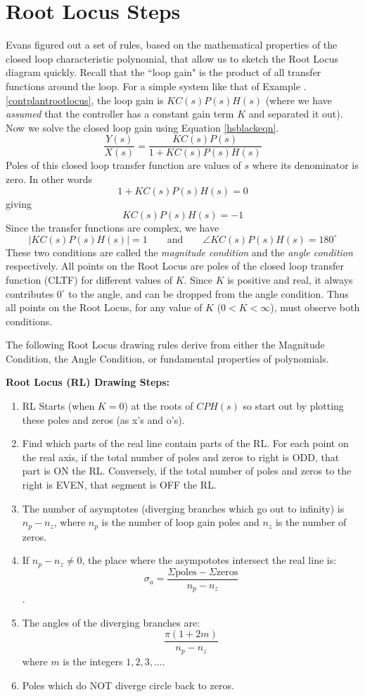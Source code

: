 \section{Root Locus Steps}

Evans figured out a set of rules, based on the mathematical properties of the closed loop characteristic polynomial, that allow us to sketch the Root Locus diagram quickly.
Recall that the ``loop gain" is the product of all transfer functions around the loop.  For a simple system like that of Example \thechapter.\ref{contplantrootlocus}, the loop gain is $KC(s)P(s)H(s)$ (where we have {\it assumed} that the controller has a constant gain term $K$ and separated it out).  Now we solve the closed loop gain using Equation \ref{hsblackeqn}.
\[
\frac{Y(s)}{X(s)} = \frac  {KC(s)P(s)}   {1+KC(s)P(s)H(s)}
\]
Poles of this closed loop transfer function are values of $s$ where its denominator is zero.  In other words
\[
 {1+KC(s)P(s)H(s)} = 0
\]
giving
\[
{KC(s)P(s)H(s)} = -1
\]
Since the transfer functions are complex, we have
\[
\left | KC(s)P(s)H(s)\right | = 1 \qquad \mathrm{and} \qquad \angle KC(s)P(s)H(s) = 180^\circ
\]
These two conditions are called the {\it magnitude condition} and the {\it angle condition} respectively.
All points on the Root Locus are poles of the closed loop transfer function (CLTF) for different values of $K$.  Since $K$ is positive and real, it always contributes $0^\circ$ to the angle, and can be dropped from the angle condition.  Thus all points on the Root Locus, for any value of $K$ ($0<K<\infty$), must observe both conditions.

The following Root Locus drawing rules derive from either the Magnitude Condition, the Angle Condition, or fundamental properties of polynomials.



{\bf Root Locus (RL) Drawing Steps:}	%
\begin{enumerate}
  \item RL Starts (when $K=0$) at the roots of $CPH(s)$ so start out by  plotting these poles and zeros (as x's and o's).
  \item Find which parts of the real line contain parts of the RL.  For each point on the real axis, if the total number of poles and zeros to right is ODD, that part is ON the RL. Conversely, if the total number of poles and zeros to the right is EVEN, that segment is OFF the RL.
  \item The number of asymptotes (diverging branches which go out to infinity)  is $n_p-n_z$, where $n_p$ is the number of loop gain poles and $n_z$ is the number of zeros.
  \item If $n_p-n_z \neq 0$, the place where the asympototes intersect the real line is:
 $$
 \sigma_a = \frac{\Sigma\mathrm{poles}- \Sigma\mathrm{zeros}}{n_p-n_z}
 $$.

 \item The angles of the diverging branches are:
 $$
 \frac{\pi(1+2m)}{n_p-n_z}
 $$
 where $m$ is the integers $1, 2 , 3, \dots$.
  \item Poles which do NOT diverge circle back to zeros.
\end{enumerate}


